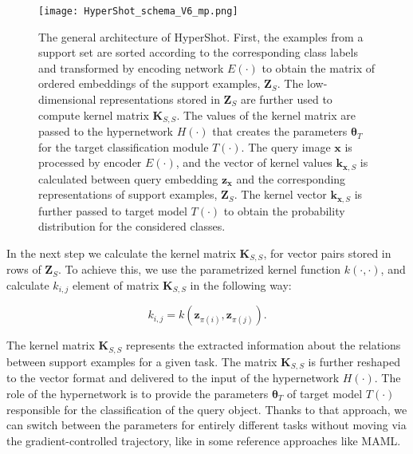 \documentclass[nohyperref]{article}
\def\our{HyperShot}
\theoremstyle{plain}
\theoremstyle{definition}
\theoremstyle{remark}
\begin{document}
\begin{figure*}[t]
    \vskip 0.2in
    \begin{center}
    \centerline{\texttt{[image: HyperShot\_schema\_V6\_mp.png]}}
    \caption{The general architecture of \our{.} First, the examples from a support set are sorted according to the corresponding class labels and transformed by encoding network  $E(\cdot)$ to obtain the matrix of ordered embeddings of the support examples, $\mathbf{Z}_S$. The low-dimensional representations stored in $\mathbf{Z}_S$ are further used to compute kernel matrix $\mathbf{K}_{S,S}$. The values of the kernel matrix are passed to the hypernetwork $H(\cdot)$ that creates the parameters $\boldsymbol{\theta}_T$ for the target classification module $T(\cdot)$. The query image $\mathbf{x}$ is processed by encoder $E(\cdot)$, and the vector of kernel values $\mathbf{k}_{\mathbf{x},S}$ is calculated between query embedding $\mathbf{z}_{\mathbf{x}}$ and the corresponding representations of support examples, $\mathbf{Z}_S$. The kernel vector $\mathbf{k}_{\mathbf{x},S}$ is further passed to target model $T(\cdot)$ to obtain the probability distribution for the considered classes.   } 
    \label{fig:architecture}
    \end{center}
    \vskip -0.2in
\end{figure*}

In the next step we calculate the kernel matrix $\mathbf{K}_{S, S}$, for vector pairs stored in rows of $\mathbf{Z}_S$. To achieve this, we use the parametrized kernel function $k(\cdot, \cdot)$, and calculate $k_{i,j}$ element of matrix $\mathbf{K}_{S, S}$ in the following way:

\begin{equation}
k_{i,j} = k(\mathbf{z}_{\pi(i)}, \mathbf{z}_{\pi(j)}).
\end{equation}


The kernel matrix $\mathbf{K}_{S, S}$ represents the extracted information about the relations between support examples for a given task. The matrix $\mathbf{K}_{S, S}$ is further reshaped to the vector format and delivered to the input of the hypernetwork $H(\cdot)$. The role of the hypernetwork is to provide the parameters $\boldsymbol \theta_T$ of target model $T(\cdot)$ responsible for the classification of the query object. Thanks to that approach, we can switch between the parameters for entirely different tasks without moving via the gradient-controlled trajectory, like in some reference approaches like MAML. 
\end{document}
